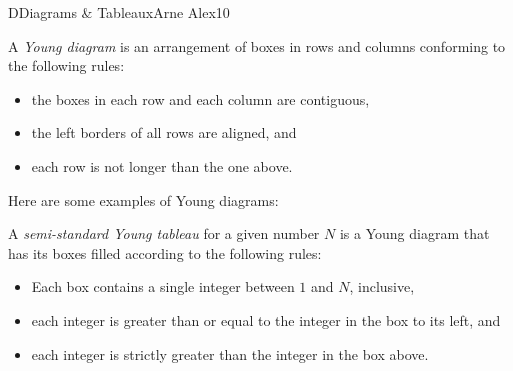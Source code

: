 \begin{icpcproblem}{D}{Diagrams \& Tableaux}{Arne Alex}{10}

A \emph{Young diagram} is an arrangement of boxes in rows and columns
conforming to the following rules:
\begin{itemize}
\item the boxes in each row and each column are
contiguous,
\item the left borders of all rows are aligned, and
\item each row is not longer than the one above.
\end{itemize}

Here are some examples of Young diagrams:

\begin{figure}[h]
\centering
{}
\end{figure}

A \emph{semi-standard Young tableau} for a given number $N$ is a Young diagram that has its boxes
filled according to the following rules:
\begin{itemize}
\item Each box contains a single integer
between $1$ and $N$, inclusive,
\item each integer is greater than or equal to the integer in the box to its left, and
\item each integer is strictly greater than the integer in the box above.
\end{itemize}


\end{icpcproblem}
